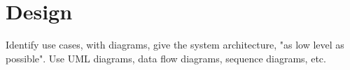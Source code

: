 \chapter*{Design}

Identify use cases, with diagrams, give the system architecture, "as low level as possible".
Use UML diagrams, data flow diagrams, sequence diagrams, etc.
